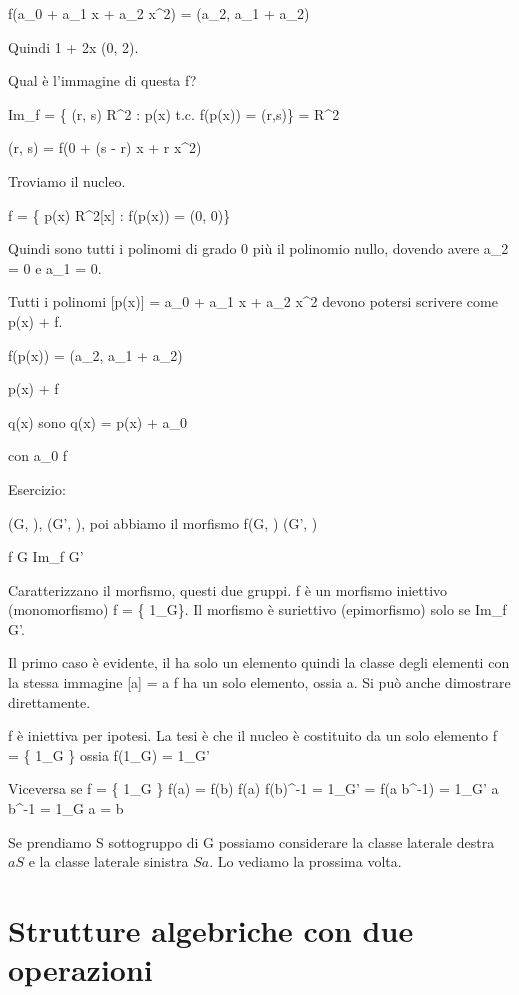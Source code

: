 f(a_0 + a_1 \cdot x + a_2 \cdot x^2) = (a_2, a_1 + a_2)

Quindi 1 + 2x \mapsto (0, 2).

Qual \`e l'immagine di questa f? 

Im_f = \{ (r, s) \in R^2 : \exists p(x) t.c. f(p(x)) = (r,s)\} = R^2

(r, s) = f(0 + (s - r) x + r x^2)

Troviamo il nucleo.

\ker f = \{ p(x) \in R^2[x] : f(p(x)) = (0, 0)\}

Quindi sono tutti i polinomi di grado 0 pi\`u il polinomio nullo, dovendo avere a_2 = 0 e a_1 = 0.

Tutti i polinomi [p(x)] = a_0 + a_1 x + a_2 x^2 devono potersi scrivere come p(x) + \ker f.

f(p(x)) = (a_2, a_1 + a_2)

p(x) + \ker f

q(x) \in [p(x)] sono q(x) = p(x) + a_0

con a_0 \in \ker f

Esercizio:

(G, \cdot), (G', \ast), poi abbiamo il morfismo f(G, \cdot) \to (G', \ast)

\ker f \subseteq G
Im_f \subseteq G'

Caratterizzano il morfismo, questi due gruppi. f \`e un morfismo iniettivo (monomorfismo) \Leftrightarrow \ker f = \{ 1_G\}. Il morfismo \`e suriettivo (epimorfismo) \Leftrightarrow solo se Im_f G'.

Il primo caso \`e evidente, il \ker ha solo un elemento quindi la classe degli elementi con la stessa immagine [a] = a \cdot \ker f ha un solo elemento, ossia a. Si pu\`o anche dimostrare direttamente.

f \`e iniettiva per ipotesi. La tesi \`e che il nucleo \`e costituito da un solo elemento \ker f = \{ 1_G \} ossia f(1_G) = 1_{G'}

Viceversa se \ker f = \{ 1_G \} \Rightarrow f(a) = f(b) \Rightarrow f(a) \cdot f(b)^{-1} = 1_{G'} = f(a \cdot b^{-1}) = 1_{G'} \Rightarrow a \cdot b^{-1} = 1_G \Rightarrow a = b

Se prendiamo S sottogruppo di G possiamo considerare la classe laterale destra $a S$ e la classe laterale sinistra $S a$. Lo vediamo la prossima volta. 








\section{Strutture algebriche con due operazioni}

